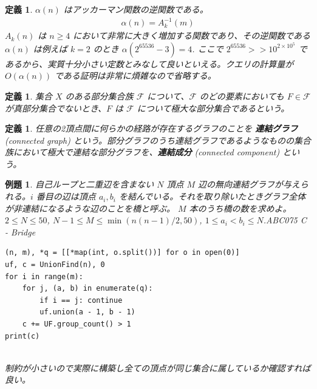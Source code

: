 \documentclass[12pt, a4j]{ltjsarticle}
\newtheorem{defi}[thm]{定義}
\newtheorem{exm}[thm]{例題}
\begin{document}
\vspace{1cm}

\begin{defi} $\alpha(n)$ はアッカーマン関数の逆関数である。
\begin{align}
\alpha(n) = A_k^{-1}(m)
\end{align}
$A_k(n)$ は $n\ge 4$ において非常に大きく増加する関数であり、その逆関数である $\alpha(n)$ は例えば $k=2$ のとき $\alpha(2^{65536}-3)=4$. ここで $2^{65536}>> 10^{2\times 10^5}$ であるから、実質十分小さい定数とみなして良いといえる。クエリの計算量が $O(\alpha(n))$ である証明は非常に煩雑なので省略する。
\end{defi}
\newpage

\begin{defi}
集合 $X$ のある部分集合族 $\mathcal{F}$ について、$\mathscr{F}$ のどの要素においても $F\in\mathscr{F}$ が真部分集合でないとき、$F$ は $\mathscr{F}$ について極大な部分集合であるという。
\end{defi}

\vspace{1cm}

\begin{defi}
任意の2頂点間に何らかの経路が存在するグラフのことを {\bf 連結グラフ} (connected graph) という。部分グラフのうち連結グラフであるようなものの集合族において極大で連結な部分グラフを、{\bf 連結成分} (connected component) という。
\end{defi}

\vspace{1cm}

\begin{exm}自己ループと二重辺を含まない $N$ 頂点 $M$ 辺の無向連結グラフが与えられる。$i$ 番目の辺は頂点 $a_i,b_i$ を結んでいる。それを取り除いたときグラフ全体が非連結になるような辺のことを橋と呼ぶ。 $M$ 本のうち橋の数を求めよ。$2\le N \le 50$, $N-1\le M \le \min(n(n-1)/2, 50)$, $1\le a_i < b_i \le N$.\quad\upshape ABC075 C - Bridge\\
\begin{lstlisting}
(n, m), *q = [[*map(int, o.split())] for o in open(0)]
uf, c = UnionFind(n), 0
for i in range(m):
    for j, (a, b) in enumerate(q):
        if i == j: continue
        uf.union(a - 1, b - 1)
    c += UF.group_count() > 1
print(c)
\end{lstlisting}\quad\\
制約が小さいので実際に構築し全ての頂点が同じ集合に属しているか確認すれば良い。
\end{exm}

\newpage
\end{document}
